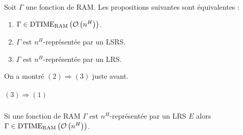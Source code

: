 \documentclass{article}
\newcommand{\dtimeramarg}[1]{\text{DTIME}_{\text{RAM}}\left( \grozo{ n^{#1} }\right)}
\begin{document}
	\begin{conj}
		Soit $\Gamma$ une fonction de RAM. Les propositions suivantes sont équivalentes :
		
		\begin{enumerate}[itemsep=-1mm]
			\item 	$\Gamma \in \dtimeramarg{H}$.
			\item 	$\Gamma$ est $n^H$-représentée par un LSRS.
			\item 	$\Gamma$ est $n^H$-représentée par un LRS.
		\end{enumerate}
	\end{conj}
	
	On a montré $(2) \Rightarrow (3)$ juste avant.
	
	
	\subparagraph{$(3) \Rightarrow (1)$}
	
		
		\begin{lemma}
			Si une fonction de RAM $\Gamma$ est $n^H$-représentée par un LRS $E$ alors $\Gamma \in \dtimeramarg{H}$.
		\end{lemma}
		
\end{document}
